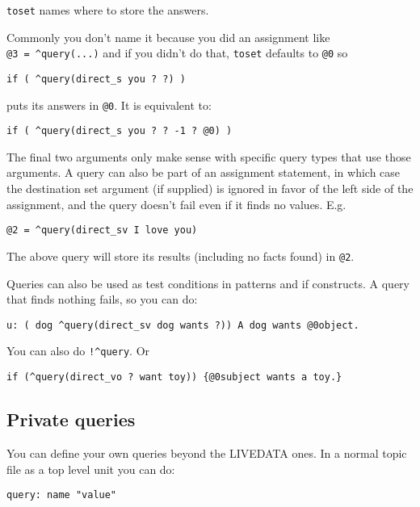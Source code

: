 \documentclass[]{article}
\begin{document}
\texttt{toset} names where to store the answers.

Commonly you don't name it because you did an assignment like
\texttt{@3\ =\ \^{}query(...)} and if you didn't do that, \texttt{toset}
defaults to \texttt{@0} so

\begin{verbatim}
if ( ^query(direct_s you ? ?) )
\end{verbatim}

puts its answers in \texttt{@0}. It is equivalent to:

\begin{verbatim}
if ( ^query(direct_s you ? ? -1 ? @0) )
\end{verbatim}

The final two arguments only make sense with specific query types that
use those arguments. A query can also be part of an assignment
statement, in which case the destination set argument (if supplied) is
ignored in favor of the left side of the assignment, and the query
doesn't fail even if it finds no values. E.g.

\begin{verbatim}
@2 = ^query(direct_sv I love you)
\end{verbatim}

The above query will store its results (including no facts found) in
\texttt{@2}.

Queries can also be used as test conditions in patterns and if
constructs. A query that finds nothing fails, so you can do:

\begin{verbatim}
u: ( dog ^query(direct_sv dog wants ?)) A dog wants @0object.
\end{verbatim}

You can also do \texttt{!\^{}query}. Or

\begin{verbatim}
if (^query(direct_vo ? want toy)) {@0subject wants a toy.}
\end{verbatim}

\subsection{Private queries}\label{private-queries}

You can define your own queries beyond the LIVEDATA ones. In a normal
topic file as a top level unit you can do:

\begin{verbatim}
query: name "value"
\end{verbatim}
\end{document}
